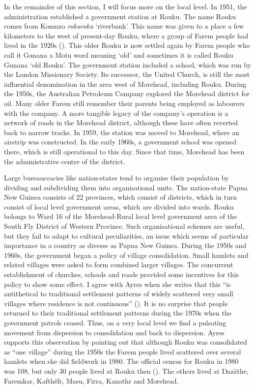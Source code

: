 In the remainder of this section, I will focus more on the local level. In 1951, the administration established a government station at Rouku. The name Rouku comes from Komnzo \emph{rokuroku} `riverbank'. This name was given to a place a few kilometers to the west of present-day Rouku, where a group of Farem people had lived in the 1920s (\citealt[14]{Ayres:ws}). This older Rouku is now settled again by Farem people who call it Gunana {\textendash} a Motu word meaning `old' {\textendash} and sometimes it is called Rouku Gunana `old Rouku'. The government station included a school, which was run by the London Missionary Society. Its successor, the United Church, is still the most influential denomination in the area west of Morehead, including Rouku. During the 1950s, the Australian Petroleum Company explored the Morehead district for oil. Many older Farem still remember their parents being employed as labourers with the company. A more tangible legacy of the company's operation is a network of roads in the Morehead district, although these have often reverted back to narrow tracks. In 1959, the station was moved to Morehead, where an airstrip was constructed. In the early 1960s, a government school was opened there, which is still operational to this day. Since that time, Morehead has been the administrative centre of the district.

\newpage 
Large bureaucracies like nation-states tend to organise their population by dividing and subdividing them into organisational units. The nation-state Papua New Guinea consists of 22 provinces, which consist of districts, which in turn consist of local level government areas, which are divided into wards. Rouku belongs to Ward 16 of the Morehead-Rural local level government area of the South Fly District of Western Province. Such organisational schemes are useful, but they fail to adapt to cultural peculiarities, an issue which seems of particular importance in a country as diverse as Papua New Guinea. During the 1950s and 1960s, the government began a policy of village consolidation. Small hamlets and related villages were asked to form combined larger villages. The concurrent establishment of churches, schools and roads provided some incentives for this policy to show some effect. I agree with Ayres when she writes that this ``is antithetical to traditional settlement patterns of widely scattered very small villages where residence is not continuous'' (\citeyear[17]{Ayres:ws}). It is no surprise that people returned to their traditional settlement patterns during the 1970s when the government patrols ceased. Thus, on a very local level we find a pulsating movement from dispersion to consolidation and back to dispersion. Ayres supports this observation by pointing out that {\textendash} although Rouku was consolidated as ``one village'' during the 1950s {\textendash} the Farem people lived scattered over several hamlets when she did fieldwork in 1980. The official census for Rouku in 1980 was 108, but only 30 people lived at Rouku then (\citeyear[17]{Ayres:ws}). The others lived at Ŋazäthe, Faremkar, Kafthéfr, Masu, Firra, Kanathr and Morehead.

